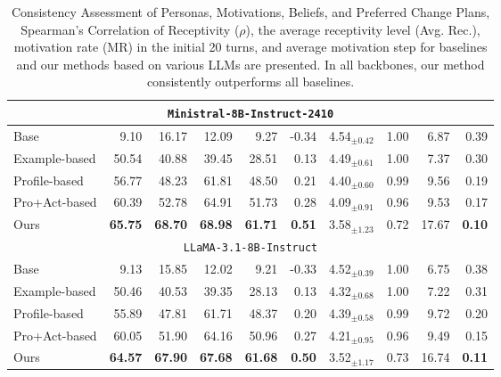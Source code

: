 \begin{table*}[tb]
{\begin{tabular}{lrrrrrrrrr}
\toprule
\multicolumn{10}{c}{\cellcolor[HTML]{EFEFEF}\texttt{Ministral-8B-Instruct-2410}}                              \\ \midrule
Base          &  9.10       & 16.17             & 12.09         &  9.27       & -0.34  & 4.54$_{\pm0.42}$    & 1.00              & 6.87          & 0.39 \\
Example-based & 50.54       & 40.88             & 39.45         & 28.51       & 0.13    & 4.49$_{\pm0.61}$   & 1.00              & 7.37          & 0.30\\
Profile-based & 56.77       & 48.23             & 61.81         & 48.50       & 0.21   & 4.40$_{\pm0.60}$    & 0.99              & 9.56          & 0.19 \\
Pro+Act-based & 60.39       & 52.78             & 64.91         & 51.73       & 0.28   & 4.09$_{\pm0.91}$    & 0.96              & 9.53          & 0.17\\ \hline
Ours          & \textbf{65.75}   & \textbf{68.70}   & \textbf{68.98}  & \textbf{61.71} & \textbf{0.51}  & 3.58$_{\pm1.23}$    & 0.72              & 17.67         & \textbf{0.10} \\ \bottomrule
\multicolumn{10}{c}{\cellcolor[HTML]{EFEFEF}\texttt{LLaMA-3.1-8B-Instruct}}                              \\ \midrule
Base          &  9.13       & 15.85             & 12.02         &  9.21       & -0.33  & 4.52$_{\pm0.39}$    & 1.00              & 6.75          & 0.38 \\
Example-based & 50.46       & 40.53             & 39.35         & 28.13       & 0.13    & 4.32$_{\pm0.68}$    & 1.00             & 7.22          & 0.31\\
Profile-based & 55.89       & 47.81             & 61.71         & 48.37       & 0.20   & 4.39$_{\pm0.58}$    & 0.99              & 9.72          & 0.20 \\
Pro+Act-based & 60.05       & 51.90             & 64.16         & 50.96       & 0.27   & 4.21$_{\pm0.95}$    & 0.96              & 9.49          & 0.15\\ \hline
Ours          & \textbf{64.57}   & \textbf{67.90}   & \textbf{67.68}  & \textbf{61.68} & \textbf{0.50}  & 3.52$_{\pm1.17}$    & 0.73              & 16.74         & \textbf{0.11} \\ \bottomrule
\end{tabular}}
\caption{Consistency Assessment of Personas, Motivations, Beliefs, and Preferred Change Plans, Spearman’s Correlation of Receptivity ($\rho$), the average receptivity level (Avg. Rec.), motivation rate (MR) in the initial 20 turns, and average motivation step for baselines and our methods based on various LLMs are presented. In all backbones, our method consistently outperforms all baselines.}
\label{tab:results for multiple models}
\end{table*}

